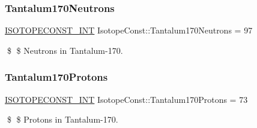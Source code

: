 \subsubsection{\texorpdfstring{Tantalum170\+Neutrons}{Tantalum170Neutrons}}
{\footnotesize\ttfamily \mbox{\hyperlink{group___isotope_const-_macros_ga5f18360b3e99483a35c32d789e62621c}{I\+S\+O\+T\+O\+P\+E\+C\+O\+N\+S\+T\+\_\+\+I\+NT}} Isotope\+Const\+::\+Tantalum170\+Neutrons = 97}

\$ \$ Neutrons in Tantalum-\/170. \mbox{\label{group___isotope_const-_tantalum-_ta170_ga87533daa7dfab8780ac3114246bff61c}} 
\subsubsection{\texorpdfstring{Tantalum170\+Protons}{Tantalum170Protons}}
{\footnotesize\ttfamily \mbox{\hyperlink{group___isotope_const-_macros_ga5f18360b3e99483a35c32d789e62621c}{I\+S\+O\+T\+O\+P\+E\+C\+O\+N\+S\+T\+\_\+\+I\+NT}} Isotope\+Const\+::\+Tantalum170\+Protons = 73}

\$ \$ Protons in Tantalum-\/170. 